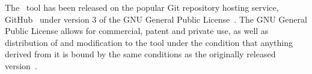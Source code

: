 The \mr~tool has been released on the popular Git repository hosting service, GitHub~\cite{github}
under version 3 of the GNU General Public License~\cite{license}. The GNU General Public License
allows for commercial, patent and private use, as well as distribution of and modification to the tool
under the condition that anything derived from it is bound by the same conditions as the originally
released version~\cite{copyleft}.

% 
% 
% 
